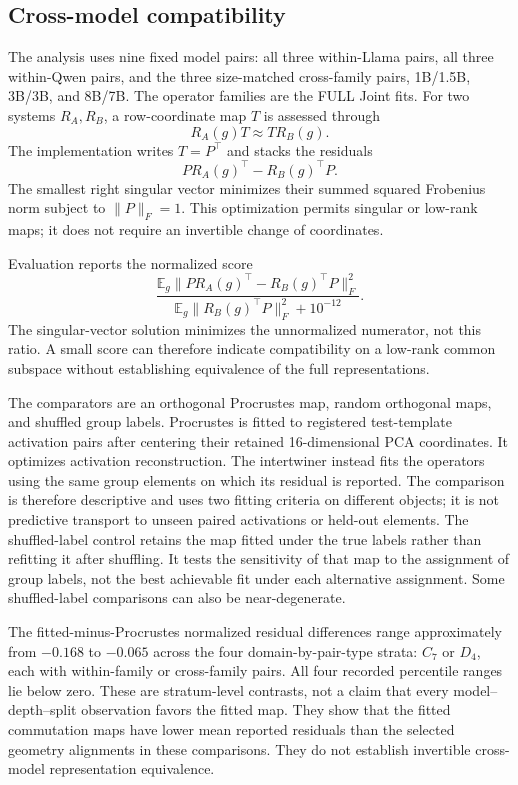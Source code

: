 \FloatBarrier


\subsection{Cross-model compatibility}

The analysis uses nine fixed model pairs:
all three within-Llama pairs, all three within-Qwen
pairs, and the three size-matched cross-family
pairs, 1B/1.5B, 3B/3B, and 8B/7B.
The operator families are the FULL Joint fits.
For two systems $R_A,R_B$, a row-coordinate
map $T$ is assessed through
\[
 R_A(g)T \approx T R_B(g).
\]
The implementation writes $T=P^\top$ and stacks
the residuals
\[
 P R_A(g)^\top-R_B(g)^\top P.
\]
The smallest right singular vector minimizes
their summed squared Frobenius norm subject to
$\|P\|_F=1$.
This optimization permits singular or low-rank
maps; it does not require an invertible
change of coordinates.

Evaluation reports the normalized score
\[
 \frac{
 \mathbb E_g
 \|P R_A(g)^\top-R_B(g)^\top P\|_F^2
 }{
 \mathbb E_g\|R_B(g)^\top P\|_F^2+10^{-12}
 }.
\]
The singular-vector solution minimizes the
unnormalized numerator, not this ratio.
A small score can therefore indicate compatibility
on a low-rank common subspace without establishing
equivalence of the full representations.

The comparators are an orthogonal Procrustes map,
random orthogonal maps, and shuffled group labels.
Procrustes is fitted to registered test-template
activation pairs after centering their retained
16-dimensional PCA coordinates.
It optimizes activation reconstruction.
The intertwiner instead fits the operators using
the same group elements on which its residual
is reported.
The comparison is therefore descriptive and
uses two fitting criteria on different objects;
it is not predictive transport to unseen paired
activations or held-out elements.
The shuffled-label control retains the map fitted
under the true labels rather than refitting it
after shuffling.
It tests the sensitivity of that map to the
assignment of group labels, not the best achievable
fit under each alternative assignment.
Some shuffled-label comparisons can also be
near-degenerate.

The fitted-minus-Procrustes normalized residual
differences range approximately from $-0.168$
to $-0.065$ across the four domain-by-pair-type
strata: $C_7$ or $D_4$, each with within-family
or cross-family pairs.
All four recorded percentile ranges lie below
zero.
These are stratum-level contrasts, not a claim
that every model--depth--split observation favors
the fitted map.
They show that the fitted commutation maps have
lower mean reported residuals than the selected
geometry alignments in these comparisons.
They do not establish invertible cross-model
representation equivalence.

